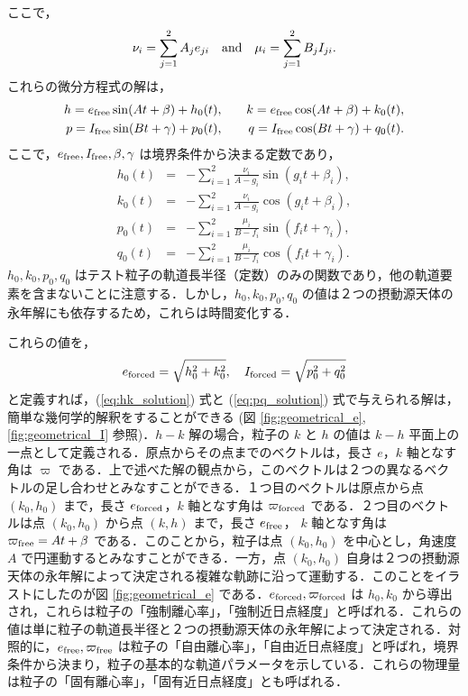 \documentclass[11pt,a4paper,oneside,onecolumn]{jarticle}
\begin{document}
ここで，
\begin{equation}
\nu_i = \sum_{j = 1}^2 A_j e_{ji} \quad {\rm and} \quad \mu_i = \sum_{j=1}^2 B_j I_{ji}. \label{eq:nu_mu}
\end{equation}
これらの微分方程式の解は，
\begin{eqnarray}
h = e_{\rm free} \sin (A t + \beta) + h_0 (t), & \quad & k = e_{\rm free} \cos (A t + \beta) + k_0 (t), \label{eq:hk_solution} \\
p = I_{\rm free} \sin (B t + \gamma) + p_0 (t), & \quad & q = I_{\rm free} \cos (B t + \gamma) + q_0 (t). \label{eq:pq_solution}
\end{eqnarray}
ここで，$e_{\rm free}, I_{\rm free}, \beta, \gamma$ は境界条件から決まる定数であり，
\begin{eqnarray}
h_0 (t) & = & - \sum_{i = 1}^2 \frac{\nu_i}{A - g_i} \sin (g_i t + \beta_i), \label{eq:h_0} \\
k_0 (t) & = & - \sum_{i = 1}^2 \frac{\nu_i}{A - g_i} \cos (g_i t + \beta_i), \label{eq:k_0} \\
p_0 (t) & = & - \sum_{i = 1}^2 \frac{\mu_i}{B - f_i} \sin (f_i t + \gamma_i), \label{eq:p_0} \\
q_0 (t) & = & - \sum_{i = 1}^2 \frac{\mu_i}{B - f_i} \cos (f_i t + \gamma_i). \label{eq:q_0} 
\end{eqnarray}
$h_0, k_0, p_0, q_0$ はテスト粒子の軌道長半径（定数）のみの関数であり，他の軌道要素を含まないことに注意する．しかし，$h_0, k_0, p_0, q_0$ の値は２つの摂動源天体の永年解にも依存するため，これらは時間変化する．

これらの値を，
\begin{equation}
e_{\rm forced} = \sqrt{h_0^2 + k_0^2}, \quad I_{\rm forced} = \sqrt{p_0^2 + q_0^2} \label{eq:forced}
\end{equation}
と定義すれば，(\ref{eq:hk_solution}) 式と (\ref{eq:pq_solution}) 式で与えられる解は，簡単な幾何学的解釈をすることができる (図 \ref{fig:geometrical_e}, \ref{fig:geometrical_I} 参照)．$h - k$ 解の場合，粒子の $k$ と $h$ の値は $k - h$ 平面上の一点として定義される．原点からその点までのベクトルは，長さ $e$，$k$ 軸となす角は $\varpi$ である．上で述べた解の観点から，このベクトルは２つの異なるベクトルの足し合わせとみなすことができる．１つ目のベクトルは原点から点 $(k_0, h_0)$ まで，長さ $e_{\rm forced}$，$k$ 軸となす角は $\varpi_{\rm forced}$ である．２つ目のベクトルは点 $(k_0, h_0)$ から点 $(k, h)$ まで，長さ $e_{\rm free}$， $k$ 軸となす角は $\varpi_{\rm free} = A t + \beta$ である．このことから，粒子は点 $(k_0, h_0)$ を中心とし，角速度 $A$ で円運動するとみなすことができる．一方，点 $(k_0, h_0)$ 自身は２つの摂動源天体の永年解によって決定される複雑な軌跡に沿って運動する．このことをイラストにしたのが図 \ref{fig:geometrical_e} である．$e_{\rm forced}, \varpi_{\rm forced}$ は $h_0, k_0$ から導出され，これらは粒子の「強制離心率」，「強制近日点経度」と呼ばれる．これらの値は単に粒子の軌道長半径と２つの摂動源天体の永年解によって決定される．対照的に，$e_{\rm free}, \varpi_{\rm free}$ は粒子の「自由離心率」，「自由近日点経度」と呼ばれ，境界条件から決まり，粒子の基本的な軌道パラメータを示している．これらの物理量は粒子の「固有離心率」，「固有近日点経度」とも呼ばれる．
\end{document}
